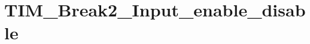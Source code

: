 \hypertarget{group___t_i_m___break2___input__enable__disable}{\section{T\-I\-M\-\_\-\-Break2\-\_\-\-Input\-\_\-enable\-\_\-disable}
\label{group___t_i_m___break2___input__enable__disable}
}
